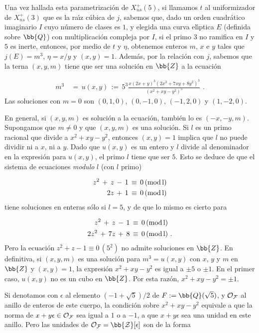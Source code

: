Una vez hallada esta parametrizaci\'{o}n de $X_{ns}^{+}(5)$, si llamamos
$t$ al uniformizador de $X_{ns}^{+}(3)$ que es la ra\'{\i}z c\'{u}bica
de $j$, sabemos que, dado un orden cuadr\'{a}tico imaginario $I$
cuyo n\'{u}mero de clases es $1$, y elegida una curva el\'{\i}ptica $E$
(definida sobre $\bb{Q}$) con multiplicaci\'{o}n compleja por $I$,
si el primo $3$ no ramifica en $I$ y $5$ es inerte, entonces, por medio
de $t$ y $\eta$, obtenemos enteros $m$, $x$ e $y$ tales que
$j(E)=m^{3}$, $\eta=x/y$ y $(x,y)=1$. Adem\'{a}s, por la relaci\'{o}n
con $j$, sabemos que la terna $(x,y,m)$ tiene que ser una soluci\'{o}n
en $\bb{Z}$ a la ecuaci\'{o}n

\begin{align*}
m^{3} & \,=\,u(x,y)\,:=\,5^{3}
\frac{x(2x+y)^{3}(2x^{2}+7xy+8y^{2})^{3}}{(x^{2}+xy-y^{2})^{5}}
\text{ .}
\end{align*}
Las soluciones con $m=0$ son $(0,1,0)$, $(0,-1,0)$, $(-1,2,0)$ y
$(1,-2,0)$. 

En general, si $(x,y,m)$ es soluci\'{o}n a la ecuaci\'{o}n, tambi\'{e}n
lo es $(-x,-y,m)$. Supongamos que $m\not =0$ y que $(x,y,m)$ es una
soluci\'{o}n. Si $l$ es un primo racional que divide a $x^{2}+xy-y^{2}$,
entonces $(x,y)=1$ implica que $l$ no puede dividir ni a $x$, ni a $y$.
Dado que $u(x,y)$ es un entero y $l$ divide al denominador en la
expresi\'{o}n para $u(x,y)$, el primo $l$ tiene que ser $5$. Esto se
deduce de que el sistema de ecuaciones \textit{modulo} $l$ (con $l$
primo)

\begin{align*}
z^{2}\,+\,z\,-\,1 & \,\equiv\, 0\,(\rm{mod}\,l)\\
2z\,+\,1 & \,\equiv\, 0\,(\rm{mod}\,l)
\end{align*}
tiene soluciones en enteras s\'{o}lo si $l=5$, y de que lo mismo es
cierto para

\begin{align*}
z^{2}\,+\,z\,-\,1 & \,\equiv\, 0\,(\rm{mod}\,l)\\
2z^{2}\,+\,7z\,+\,8 & \,\equiv\, 0\,(\rm{mod}\,l)\text{ .}
\end{align*}
Pero la ecuaci\'{o}n $z^{2}+z-1\equiv 0\,(5^{2})$ no admite soluciones
en $\bb{Z}$. En definitiva, si $(x,y,m)$ es una soluci\'{o}n
para $m^{3}=u(x,y)$ con $x$, $y$ y $m$ en $\bb{Z}$ y $(x,y)=1$,
la expresi\'{o}n $x^{2}+xy-y^{2}$ es igual a $\pm 5$ o $\pm 1$. En el
primer caso, $u(x,y)$ no es un cubo en $\bb{Z}$. Por esta raz\'{o}n,
$x^{2}+xy-y^{2}=\pm 1$.

Si denotamos con $\epsilon$ al elemento $(-1+\sqrt{5})/2$ de
$F:=\bb{Q}(\sqrt{5})$, y $\cal{O}_{F}$ al anillo de enteros de este
cuerpo, la condici\'{o}n sobre $x^{2}+xy-y^{2}$ equivale a que
la norma de $x+y\epsilon\in\cal{O}_{F}$ sea igual a $1$ o a $-1$, a que
$x+y\epsilon$ sea una unidad en este anillo.
Pero las unidades de $\cal{O}_{F}=\bb{Z}[\epsilon]$ son de la forma


